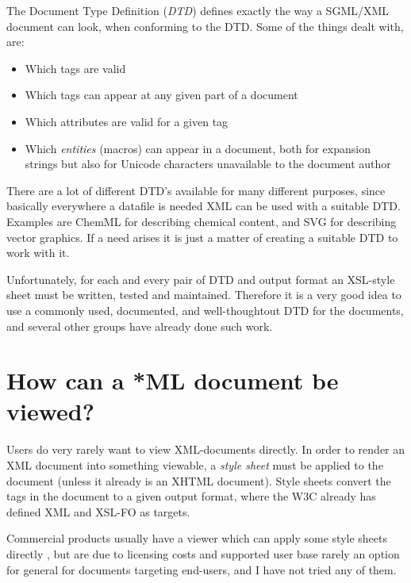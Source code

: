 The Document Type Definition (\emph{DTD}) defines exactly the way a
SGML/XML document can look, when conforming to the DTD.  Some of the
things dealt with, are:

\begin{itemize}
\item Which tags are valid
\item Which tags can appear at any given part of a document
\item Which attributes are valid for a given tag
\item Which \emph{entities} (macros) can appear in a document, both
for expansion strings but also for Unicode characters unavailable to
the document author
\end{itemize}

There are a lot of different DTD's available for many different
purposes, since basically everywhere a datafile is needed XML can be
used with a suitable DTD.  Examples are ChemML for describing chemical
content, and SVG for describing vector graphics. If a need arises it
is just a matter of creating a suitable DTD to work with it.

Unfortunately, for each and every pair of DTD and output format an
XSL-style sheet must be written, tested and maintained.  Therefore it
is a very good idea to use a commonly used, documented, and
well-thoughtout DTD for the documents, and several other groups have
already done such work. 



\section{How can a *ML document be viewed?}

Users do very rarely want to view XML-documents directly.  In order to
render an XML document into something viewable, a \textit{style sheet}
must be applied to the document (unless it already is an XHTML document).
Style sheets convert the tags in the document to a given output
format, where the W3C already has defined XML and XSL-FO as targets.


Commercial products usually have a viewer which can apply some style
sheets directly%
, but are due to licensing costs and supported user base rarely an
option for general for documents targeting end-users, and I have not
tried any of them.

